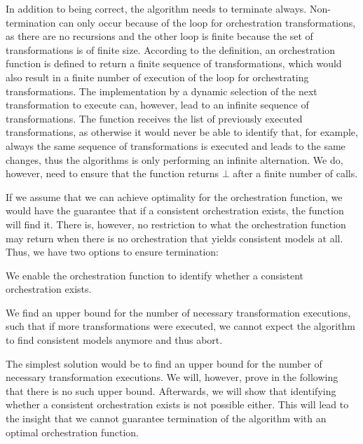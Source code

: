 In addition to being correct, the algorithm needs to terminate always.
Non-termination can only occur because of the loop for orchestration transformations, as there are no recursions and the other loop is finite because the set of transformations is of finite size.
According to the definition, an orchestration function is defined to return a finite sequence of transformations, which would also result in a finite number of execution of the loop for orchestrating transformations.
The implementation by a dynamic selection of the next transformation to execute can, however, lead to an infinite sequence of transformations.
The  function receives the list of previously executed transformations, as otherwise it would never be able to identify that, for example, always the same sequence of transformations is executed and leads to the same changes, thus the algorithms is only performing an infinite alternation.
We do, however, need to ensure that the  function returns $\bot$ after a finite number of calls.

If we assume that we can achieve optimality for the orchestration function, we would have the guarantee that if a consistent orchestration exists, the function will find it.
There is, however, no restriction to what the orchestration function may return when there is no orchestration that yields consistent models at all.
Thus, we have two options to ensure termination:
\begin{longenumerate}
    \item We enable the orchestration function to identify whether a consistent orchestration exists.
    \item We find an upper bound for the number of necessary transformation executions, such that if more transformations were executed, we cannot expect the algorithm to find consistent models anymore and thus abort. 
\end{longenumerate}

The simplest solution would be to find an upper bound for the number of necessary transformation executions.
We will, however, prove in the following that there is no such upper bound.
Afterwards, we will show that identifying whether a consistent orchestration exists is not possible either.
This will lead to the insight that we cannot guarantee termination of the algorithm with an optimal orchestration function.


